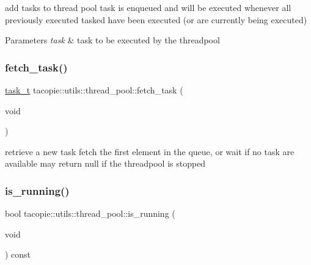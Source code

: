 add tasks to thread pool task is enqueued and will be executed whenever all previously executed tasked have been executed (or are currently being executed)


\begin{DoxyParams}{Parameters}
{\em task} & task to be executed by the threadpool \\
\hline
\end{DoxyParams}
\mbox{\label{classtacopie_1_1utils_1_1thread__pool_a182472a7727edc7d37d2309ccbc2dea7}} 
\subsubsection{\texorpdfstring{fetch\+\_\+task()}{fetch\_task()}}
{\footnotesize\ttfamily \hyperlink{classtacopie_1_1utils_1_1thread__pool_a8ae8886fdeaa8e5c0abad12626a47296}{task\+\_\+t} tacopie\+::utils\+::thread\+\_\+pool\+::fetch\+\_\+task (\begin{DoxyParamCaption}\item[{void}]{ }\end{DoxyParamCaption})\hspace{0.3cm}{\ttfamily [private]}}

retrieve a new task fetch the first element in the queue, or wait if no task are available may return null if the threadpool is stopped \mbox{\label{classtacopie_1_1utils_1_1thread__pool_a77a647a75be188a5c5f83b922c061107}} 
\subsubsection{\texorpdfstring{is\+\_\+running()}{is\_running()}}
{\footnotesize\ttfamily bool tacopie\+::utils\+::thread\+\_\+pool\+::is\+\_\+running (\begin{DoxyParamCaption}\item[{void}]{ }\end{DoxyParamCaption}) const}


